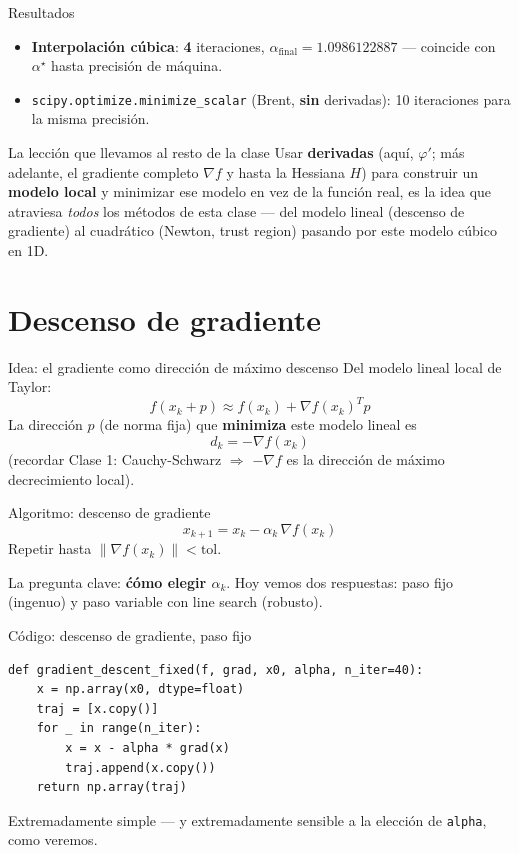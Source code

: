 \documentclass[aspectratio=169]{beamer}
\newcommand{\grad}{\nabla}
\begin{document}
\begin{frame}{Resultados}
  \begin{itemize}
    \item \textbf{Interpolaci\'on c\'ubica}: \textbf{4} iteraciones, $\alpha_{\text{final}}=1.0986122887$ --- coincide con $\alpha^\star$ hasta precisi\'on de m\'aquina.
    \item \texttt{scipy.optimize.minimize\_scalar} (Brent, \textbf{sin} derivadas): 10 iteraciones para la misma precisi\'on.
  \end{itemize}
  \begin{alertblock}{La lecci\'on que llevamos al resto de la clase}
    Usar \textbf{derivadas} (aqu\'i, $\varphi'$; m\'as adelante, el gradiente completo $\grad f$ y hasta la Hessiana $H$) para construir un \textbf{modelo local} y minimizar ese modelo en vez de la funci\'on real, es la idea que atraviesa \emph{todos} los m\'etodos de esta clase --- del modelo lineal (descenso de gradiente) al cuadr\'atico (Newton, trust region) pasando por este modelo c\'ubico en 1D.
  \end{alertblock}
\end{frame}

\section{Descenso de gradiente}

\begin{frame}{Idea: el gradiente como direcci\'on de m\'aximo descenso}
  \small
  Del modelo lineal local de Taylor:
  \[ f(x_k + p) \approx f(x_k) + \grad f(x_k)^T p \]
  La direcci\'on $p$ (de norma fija) que \textbf{minimiza} este modelo lineal es
  \[ d_k = -\grad f(x_k) \]
  (recordar Clase 1: Cauchy-Schwarz $\Rightarrow$ $-\grad f$ es la direcci\'on de m\'aximo decrecimiento local).
  \begin{block}{Algoritmo: descenso de gradiente}
    \[ x_{k+1} = x_k - \alpha_k \, \grad f(x_k) \]
    Repetir hasta $\|\grad f(x_k)\| < \text{tol}$.
  \end{block}
  La pregunta clave: \textbf{\'c\'omo elegir $\alpha_k$}. Hoy vemos dos respuestas: paso fijo (ingenuo) y paso variable con line search (robusto).
\end{frame}

\begin{frame}[fragile]{C\'odigo: descenso de gradiente, paso fijo}
\begin{lstlisting}
def gradient_descent_fixed(f, grad, x0, alpha, n_iter=40):
    x = np.array(x0, dtype=float)
    traj = [x.copy()]
    for _ in range(n_iter):
        x = x - alpha * grad(x)
        traj.append(x.copy())
    return np.array(traj)
\end{lstlisting}
  \centering\small
  Extremadamente simple --- y extremadamente sensible a la elecci\'on de \texttt{alpha}, como veremos.
\end{frame}
\end{document}
